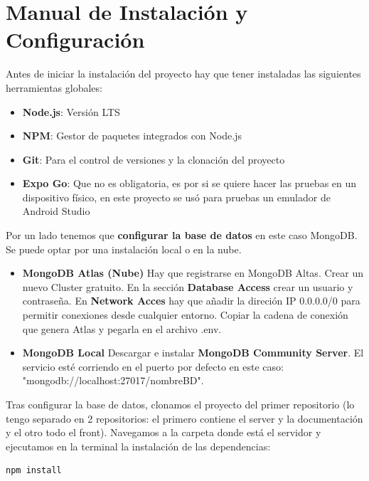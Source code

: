 \documentclass[a4paper,11pt]{article}
\begin{document}
\section{Manual de Instalación y Configuración}
Antes de iniciar la instalación del proyecto hay que tener instaladas las siguientes herramientas globales:
\begin{itemize}
    \item \textbf{Node.js}: Versión LTS
    \item \textbf{NPM}: Gestor de paquetes integrados con Node.js
    \item \textbf{Git}: Para el control de versiones y la clonación del proyecto
    \item \textbf{Expo Go}: Que no es obligatoria, es por si se quiere hacer las pruebas en un dispositivo físico, en este proyecto se usó para pruebas un emulador de Android Studio 
\end{itemize}

Por un lado tenemos que \textbf{configurar la base de datos} en este caso MongoDB. Se puede optar por una instalación local o en la nube.
\begin{itemize}
    \item \textbf{MongoDB Atlas (Nube)}
    \subitem Hay que registrarse en MongoDB Altas.
    \subitem Crear un nuevo Cluster gratuito.
    \subitem En la sección \textbf{Database Access} crear un usuario y contraseña.
    \subitem En \textbf{Network Acces} hay que añadir la direción IP 0.0.0.0/0 para permitir conexiones desde cualquier entorno.
    \subitem Copiar la cadena de conexión que genera Atlas y pegarla en el archivo .env.
    \item \textbf{MongoDB Local}
    \subitem Descargar e instalar \textbf{MongoDB Community Server}.
    \subitem El servicio esté corriendo en el puerto por defecto en este caso: "mongodb://localhost:27017/nombreBD".
\end{itemize}

Tras configurar la base de datos, clonamos el proyecto del primer repositorio (lo tengo separado en 2 repositorios: el primero contiene el server y la documentación y el otro todo el front). Navegamos a la carpeta donde está el servidor y ejecutamos en la terminal la instalación de las dependencias: 

\vspace{0.5cm}

\begin{lstlisting}[style=javascript, caption={Comando para instalación de dependencias}]
    npm install
\end{lstlisting}
\end{document}
